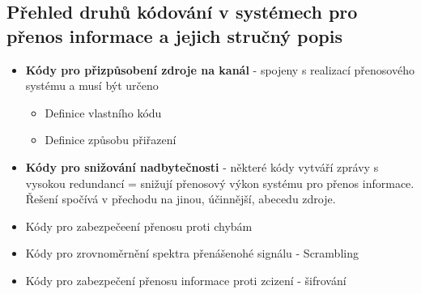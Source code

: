 \subsection{Přehled druhů kódování v systémech pro přenos informace a jejich stručný popis}
\begin{itemize}
    \item  \textbf{Kódy pro přizpůsobení zdroje na kanál} - spojeny s realizací přenosového systému a musí být určeno
\begin{itemize}
    \item Definice vlastního kódu
    \item Definice způsobu přiřazení
\end{itemize}
\item \textbf{Kódy pro snižování nadbytečnosti} - některé kódy vytváří zprávy s vysokou redundancí = snižují přenosový výkon systému pro přenos informace. Řešení spočívá v přechodu na jinou, účinnější, abecedu zdroje.
\item Kódy pro zabezpečeení přenosu proti chybám
\item Kódy pro zrovnoměrnění spektra přenášenohé signálu - Scrambling
\item Kódy pro zabezpečení přenosu informace proti zcizení - šifrování
\end{itemize}